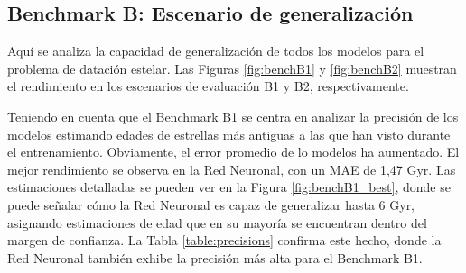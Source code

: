 \begin{table}
\centering
{}%
\caption{Precisión de todos los métodos en los diferentes benchmarks. La precisión se mide como el porcentaje de estimaciones de edad que caen dentro del margen de confianza asociado a cada estrella.}\label{table:precisions}
\end{table}


\subsection{Benchmark B: Escenario de generalización}

Aquí se analiza la capacidad de generalización de todos los modelos para el problema de datación estelar. Las Figuras \ref{fig:benchB1} y \ref{fig:benchB2} muestran el rendimiento en los escenarios de evaluación B1 y B2, respectivamente.

Teniendo en cuenta que el Benchmark B1 se centra en analizar la precisión de los modelos estimando edades de estrellas más antiguas a las que han visto durante el entrenamiento. Obviamente, el error promedio de lo modelos ha aumentado. El mejor rendimiento se observa en la Red Neuronal, con un MAE de 1,47 Gyr. Las estimaciones detalladas se pueden ver en la Figura \ref{fig:benchB1_best}, donde se puede señalar cómo la Red Neuronal es capaz de generalizar hasta 6 Gyr, asignando estimaciones de edad que en su mayoría se encuentran dentro del margen de confianza. La Tabla \ref{table:precisions} confirma este hecho, donde la Red Neuronal también exhibe la precisión más alta para el Benchmark B1.


